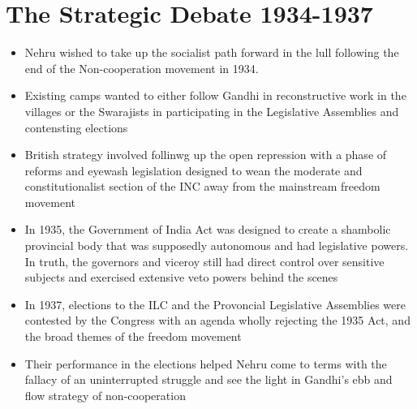 \section{The Strategic Debate 1934-1937}
\begin{itemize}
    \item Nehru wished to take up the socialist path forward in the lull following the end of the Non-cooperation movement in 1934.
    \item Existing camps wanted to either follow Gandhi in reconstructive work in the villages or the Swarajists in participating in the Legislative Assemblies and contensting elections
    \item British strategy involved follinwg up the open repression with a phase of reforms and eyewash legislation designed to wean the moderate and constitutionalist section of the INC away from the mainstream freedom movement
    \item In 1935, the Government of India Act was designed to create a shambolic provincial body that was supposedly autonomous and had legislative powers. In truth, the governors and viceroy still had direct control over sensitive subjects and exercised extensive veto powers behind the scenes
    \item In 1937, elections to the ILC and the Provoncial Legislative Assemblies were contested by the Congress with an agenda wholly rejecting the 1935 Act, and the broad themes of the freedom movement
    \item Their performance in the elections helped Nehru come to terms with the fallacy of an uninterrupted struggle and see the light in Gandhi's ebb and flow strategy of non-cooperation
\end{itemize}

